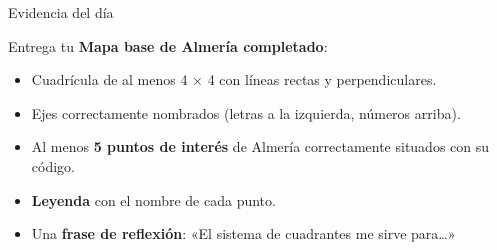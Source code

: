 \documentclass[aspectratio=169, 10pt, spanish]{beamer}
\begin{document}
\begin{frame}{Evidencia del día}
  \begin{evidenciabox}
    Entrega tu \textbf{Mapa base de Almería completado}:
    \begin{itemize}
      \item Cuadrícula de al menos 4 × 4 con líneas rectas
            y perpendiculares.
      \item Ejes correctamente nombrados
            (letras a la izquierda, números arriba).
      \item Al menos \textbf{5 puntos de interés} de Almería
            correctamente situados con su código.
      \item \textbf{Leyenda} con el nombre de cada punto.
      \item Una \textbf{frase de reflexión}:
            «El sistema de cuadrantes me sirve para\ldots»
    \end{itemize}
  \end{evidenciabox}
\end{frame}
\end{document}
